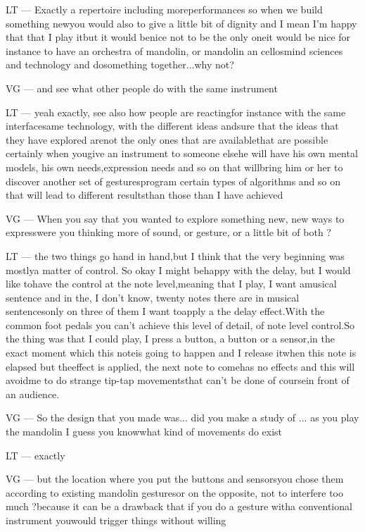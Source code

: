 LT — Exactly a repertoire including moreperformances so when we build something newyou would also to give a little bit of dignity and I mean I'm happy that that I play itbut it would benice not to be the only oneit would be nice for instance to have an orchestra of mandolin, or mandolin an cellosmind sciences and technology and dosomething together...why not?

VG — and see what other people do with the same instrument

LT — yeah exactly, see also how people are reactingfor instance with the same interfacesame technology, with the different ideas andsure that the ideas that they have explored arenot the only ones that are availablethat are possible certainly when yougive an instrument to someone elsehe will have his own mental models, his own needs,expression needs and so on that willbring him or her to discover another set of gesturesprogram certain types of algorithms and so on that will lead to different resultsthan those than I have achieved

VG — When you say that you wanted to explore something new, new ways to expresswere you thinking more of sound, or gesture, or a little bit of both ?

LT — the two things go hand in hand,but I think that the very beginning was mostlya matter of control. So okay I might behappy with the delay, but I would like tohave the control at the note level,meaning that I play, I want amusical sentence and in the, I don't know, twenty notes there are in musical sentencesonly on three of them I want toapply a the delay effect.With the common foot pedals you can't achieve this level of detail, of note level control.So the thing was that I could play, I press a button, a button or a sensor,in the exact moment which this noteis going to happen and I release itwhen this note is elapsed but theeffect is applied, the next note to comehas no effects and this will avoidme to do strange tip-tap movementsthat can't be done of coursein front of an audience.

VG — So the design that you made was... did you make a study of ... as you play the mandolin I guess you knowwhat kind of movements do exist 

LT — exactly

VG — but the location where you put the buttons and sensorsyou chose them according to existing mandolin gesturesor on the opposite, not to interfere too much ?because it can be a drawback that if you do a gesture witha conventional instrument youwould trigger things without willing

